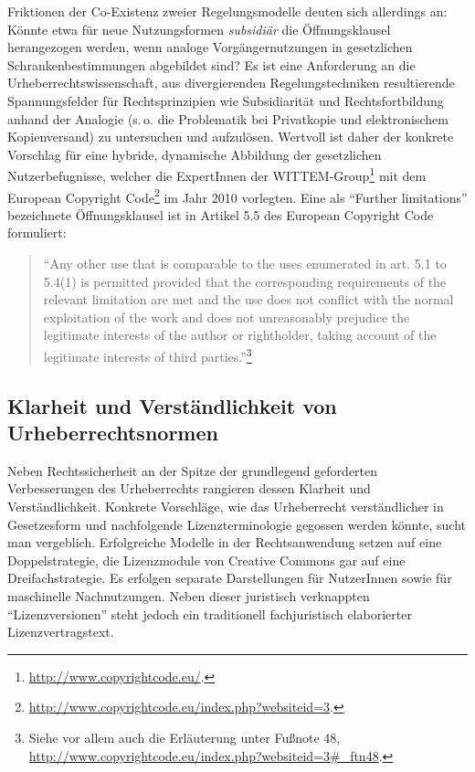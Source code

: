 \documentclass[output=paper]{langscibook}
\begin{document}
Friktionen der Co-Existenz zweier Regelungsmodelle deuten sich
allerdings an: Könnte etwa für neue Nutzungsformen \emph{subsidiär} die
Öffnungsklausel herangezogen werden, wenn analoge Vorgängernutzungen in
gesetzlichen Schrankenbestimmungen abgebildet sind? Es ist eine
Anforderung an die Urheberrechtswissenschaft, aus divergierenden
Regelungstechniken resultierende Spannungsfelder für Rechtsprinzipien
wie Subsidiarität und Rechtsfortbildung anhand der Analogie (s.\,o. die
Problematik bei Privatkopie und elektronischem Kopienversand) zu
untersuchen und aufzulösen. Wertvoll ist daher der konkrete Vorschlag
für eine hybride, dynamische Abbildung der gesetzlichen
Nutzerbefugnisse, welcher die ExpertInnen der WITTEM-Group\footnote{\url{http://www.copyrightcode.eu/}.}
mit dem European Copyright Code\footnote{\url{http://www.copyrightcode.eu/index.php?websiteid=3}.}
im Jahr 2010 vorlegten. Eine als \enquote{Further limitations}
bezeichnete Öffnungsklausel ist in Artikel 5.5 des European Copyright
Code formuliert:

\begin{quote}
\enquote{Any other use that is comparable to the uses enumerated in art.
5.1 to 5.4(1) is permitted provided that the corresponding requirements
of the relevant limitation are met and the use does not conflict with
the normal exploitation of the work and does not unreasonably prejudice
the legitimate interests of the author or rightholder, taking account of
the legitimate interests of third parties.}\footnote{Siehe vor allem
  auch die Erläuterung unter Fußnote 48,
  \url{http://www.copyrightcode.eu/index.php?websiteid=3\#_ftn48}.}
\end{quote}

\hypertarget{klarheit-und-verstuxe4ndlichkeit-von-urheberrechtsnormen}{%
\subsection{Klarheit und Verständlichkeit von
Urheberrechtsnormen}\label{klarheit-und-verstuxe4ndlichkeit-von-urheberrechtsnormen}}

Neben Rechtssicherheit an der Spitze der grundlegend geforderten
Verbesserungen des Urheberrechts rangieren dessen Klarheit und
Verständlichkeit. Konkrete Vorschläge, wie das Urheberrecht
verständlicher in Gesetzesform und nachfolgende Lizenzterminologie
gegossen werden könnte, sucht man vergeblich. Erfolgreiche Modelle in
der Rechtsanwendung setzen auf eine Doppelstrategie, die Lizenzmodule
von Creative Commons gar auf eine Dreifachstrategie. Es erfolgen
separate Darstellungen für NutzerInnen sowie für maschinelle
Nachnutzungen. Neben dieser juristisch verknappten
\enquote{Lizenzversionen} steht jedoch ein traditionell fachjuristisch
elaborierter Lizenzvertragstext.
\end{document}
